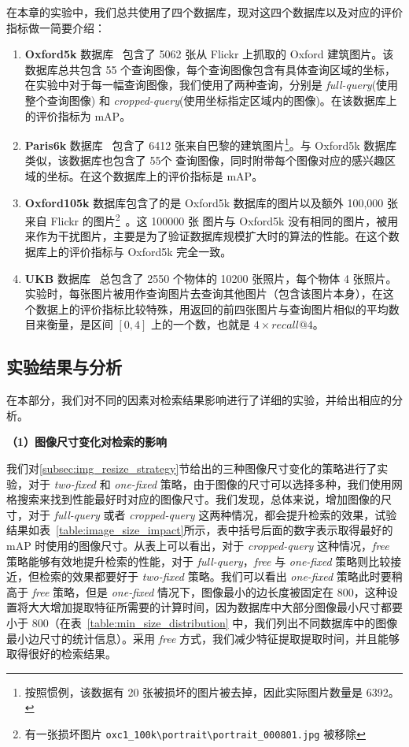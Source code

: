 在本章的实验中，我们总共使用了四个数据库，现对这四个数据库以及对应的评价指标做一简要介绍：
\begin{enumerate}
\item \textbf{Oxford5k} 数据库~\cite{Philbin2007ObjectRW} 包含了 5062 张从 Flickr 上抓取的 Oxford 建筑图片。该数据库总共包含 55 个查询图像，每个查询图像包含有具体查询区域的坐标，在实验中对于每一幅查询图像，我们使用了两种查询，分别是 \emph{full-query}(使用整个查询图像) 和 \emph{cropped-query}(使用坐标指定区域内的图像)。在该数据库上的评价指标为 mAP。


\item \textbf{Paris6k} 数据库~\cite{Philbin2008LostIQ} 包含了 6412 张来自巴黎的建筑图片\footnote{按照惯例，该数据有 20 张被损坏的图片被去掉，因此实际图片数量是 6392。}。与 Oxford5k 数据库类似，该数据库也包含了 55个 查询图像，同时附带每个图像对应的感兴趣区域的坐标。在这个数据库上的评价指标是 mAP。

\item \textbf{Oxford105k} 数据库包含了的是 Oxford5k 数据库的图片以及额外 100,000 张来自 Flickr 的图片\footnote{有一张损坏图片 \verb+oxc1_100k\portrait\portrait_000801.jpg+ 被移除}~\cite{Philbin2007ObjectRW}。这 100000 张
图片与 Oxford5k 没有相同的图片，被用来作为干扰图片，主要是为了验证数据库规模扩大时的算法的性能。在这个数据库上的评价指标与 Oxford5k 完全一致。

\item  \textbf{UKB} 数据库~\cite{Nistr2006ScalableRW} 总包含了 2550 个物体的 10200 张照片，每个物体 4 张照片。实验时，每张图片被用作查询图片去查询其他图片（包含该图片本身），在这个数据上的评价指标比较特殊，用返回的前四张图片与查询图片相似的平均数目来衡量，是区间 $[0,4]$ 上的一个数，也就是 $4\times recall@4$。

\end{enumerate}

\subsection{实验结果与分析}
在本部分，我们对不同的因素对检索结果影响进行了详细的实验，并给出相应的分析。

\noindent\textbf{（1）图像尺寸变化对检索的影响}

我们对\ref{subsec:img_resize_strategy}节给出的三种图像尺寸变化的策略进行了实验，对于 \emph{two-fixed} 和
\emph{one-fixed} 策略，由于图像的尺寸可以选择多种，我们使用网格搜索来找到性能最好时对应的图像尺寸。我们发现，总体来说，增加图像的尺寸，对于 \emph{full-query} 或者 \emph{cropped-query} 这两种情况，都会提升检索的效果，试验结果如表~\ref{table:image_size_impact}所示，表中括号后面的数字表示取得最好的 mAP 时使用的图像尺寸。从表上可以看出，对于 \emph{cropped-query} 这种情况，\emph{free} 策略能够有效地提升检索的性能，对于 \emph{full-query}，\emph{free} 与 \emph{one-fixed} 策略则比较接近，但检索的效果都要好于 \emph{two-fixed} 策略。我们可以看出 \emph{one-fixed} 策略此时要稍高于 \emph{free} 策略，但是 \emph{one-fixed} 情况下，图像最小的边长度被固定在 800，这种设置将大大增加提取特征所需要的计算时间，因为数据库中大部分图像最小尺寸都要小于 800（在表~\ref{table:min_size_distribution} 中，我们列出不同数据库中的图像最小边尺寸的统计信息）。采用 \emph{free} 方式，我们减少特征提取提取时间，并且能够取得很好的检索结果。

